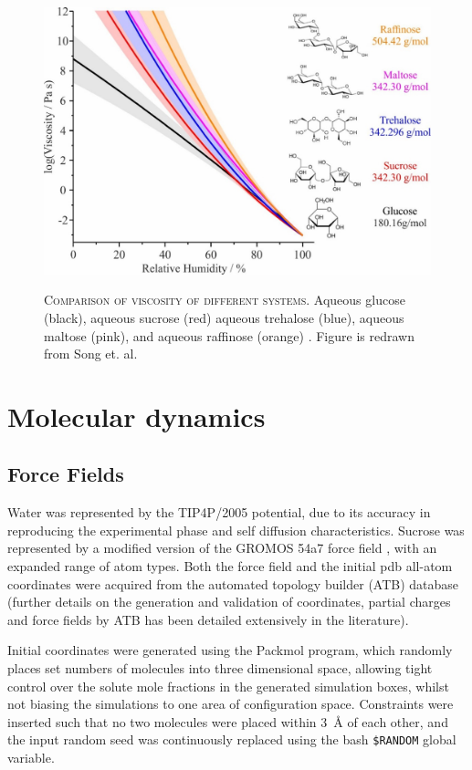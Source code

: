 \begin{figure}
    \centering
    \caption[Comparison of viscosity of different systems]{\textsc{Comparison of viscosity of different systems}. Aqueous glucose (black), aqueous sucrose (red) aqueous trehalose (blue), aqueous maltose (pink), and aqueous raffinose (orange) \cite{Song2016a}. Figure is redrawn from Song et. al. \cite{Song2016a}}
    \includegraphics{chapters/water_hopping/figures/image014.jpg}
    \label{fig:wat_s6}
\end{figure}

\section{Molecular dynamics}
\subsection{Force Fields}
Water was represented by the TIP4P/2005 \cite{abascalGeneralPurposeModel2005} potential, due to its accuracy in reproducing the experimental phase and self diffusion characteristics. Sucrose was represented by a modified version of the GROMOS 54a7 force field \cite{oostenbrinkBiomolecularForceField2004}, with an expanded range of atom types. Both the force field and the initial pdb all-atom coordinates were acquired from the automated topology builder (ATB) database \cite{koziaraTestingValidationAutomated2014} (further details on the generation \cite{maldeAutomatedForceField2011} and validation \cite{schmidDefinitionTestingGROMOS2011} of coordinates, partial charges and force fields by ATB has been detailed extensively in the literature).

Initial coordinates were generated using the Packmol \cite{martinez2009packmol} program, which randomly places set numbers of molecules into three dimensional space, allowing tight control over the solute mole fractions in the generated simulation boxes, whilst not biasing the simulations to one area of configuration space. Constraints were inserted such that no two molecules were placed within \SI{3}{\angstrom} of each other, and the input random seed was continuously replaced using the bash \texttt{\$RANDOM} global variable. 

